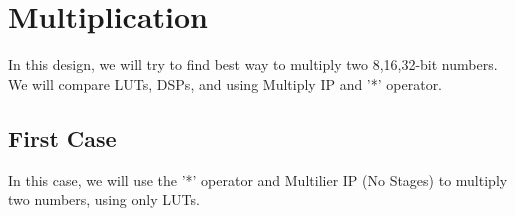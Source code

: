 \documentclass{report}
\begin{document}




\section{Multiplication}
In this design, we will try to find best way to multiply two 8,16,32-bit numbers. We will compare LUTs, DSPs, and using Multiply IP and '*' operator.

\subsection{First Case}
In this case, we will use the '*' operator and Multilier IP (No Stages) to multiply two numbers, using only LUTs.
\end{document}
